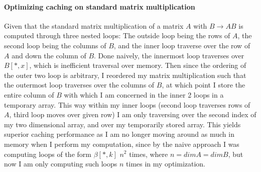 \documentclass[10pt,letter]{article}
\begin{document}
\paragraph{Optimizing caching on standard matrix multiplication}
Given that the standard matrix multiplication of a matrix $A$ with $B\rightarrow AB$ is computed through three nested loops: The outside loop being the rows of $A$, the second loop being the columns of $B$, and the inner loop traverse over the row of $A$ and down the column of $B$. Done naively, the innermost loop traverses over $B[*, x]$, which is inefficient traversal over memory. Then since the ordering of the outer two loop is arbitrary, I reordered my matrix multiplication such that the outermost loop traverses over the columns of $B$, at which point I store the entire column of $B$ with which I am concerned in the inner 2 loops in a temporary array. This way within my inner loops (second loop traverses rows of $A$, third loop moves over given row) I am only traversing over the second index of my two dimensional array, and over my temporarily stored array. This yields superior caching performance as I am no longer moving around as much in memory when I perform my computation, since by the naive approach I was computing loops of the form $\beta [*, k]$ $n^2$ times, where $n= dimA =dimB$, but now I am only computing such loops $n$ times in my optimization. 
\end{document}
